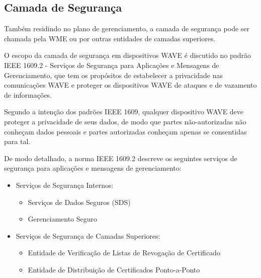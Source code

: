 \documentclass[
12pt,				%
openright,			%
oneside,			%
a4paper,			%
brazil,				%
]{abntex2}
\begin{document}
	\subsection{Camada de Segurança}
	
	\par Também residindo no plano de gerenciamento, a camada de segurança pode ser chamada pela WME ou por outras entidades de camadas superiores.
	
	\par O escopo da camada de segurança em dispositivos WAVE é discutido no padrão IEEE 1609.2 - Serviços de Segurança para Aplicações e Mensagens de Gerenciamento, que tem os propósitos de estabelecer a privacidade nas comunicações WAVE e proteger os dispositivos WAVE de ataques e de vazamento de informações.

	\par Segundo a intenção dos padrões IEEE 1609, qualquer dispositivo WAVE deve proteger a privacidade de seus dados, de modo que partes não-autorizadas não conheçam dados pessoais e partes autorizadas conheçam apenas se consentidas para tal.

	\par De modo detalhado, a norma IEEE 1609.2 descreve os seguintes serviços de segurança para aplicações e mensagens de gerenciamento:

	\begin{itemize}
		\item Serviços de Segurança Internos:
		\begin{itemize}	
			\item Serviços de Dados Seguros (SDS)
			\item Gerenciamento Seguro
		\end{itemize}
		\item Serviços de Segurança de Camadas Superiores:
		\begin{itemize}	
			\item Entidade de Verificação de Listas de Revogação de Certificado
			\item Entidade de Distribuição de Certificados Ponto-a-Ponto
		\end{itemize}		
	\end{itemize}
\end{document}
